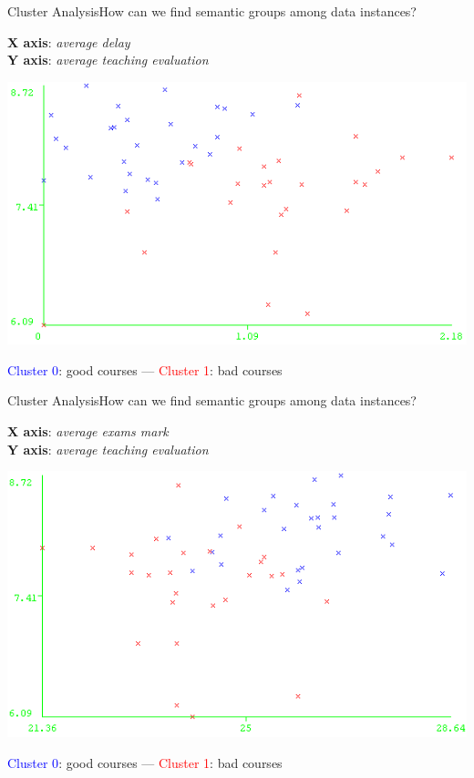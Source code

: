 \begin{frame}{Cluster Analysis}{How can we find semantic groups among data instances?}

\textbf{X axis}: \emph{average delay} \\ \textbf{Y axis}: \emph{average teaching evaluation}

    \vspace{0.1cm}
    \begin{centering}
        \hspace{0.5cm}\includegraphics[scale=0.46]{cluster2.png}
    \end{centering}

    \textcolor{blue}{Cluster 0}: good courses --- \textcolor{red}{Cluster 1}: bad courses

\end{frame}

\begin{frame}{Cluster Analysis}{How can we find semantic groups among data instances?}

\textbf{X axis}: \emph{average exams mark} \\ \textbf{Y axis}: \emph{average teaching evaluation}

    \vspace{0.1cm}
    \begin{centering}
        \hspace{0.5cm}\includegraphics[scale=0.46]{cluster3.png}
    \end{centering}

    \textcolor{blue}{Cluster 0}: good courses --- \textcolor{red}{Cluster 1}: bad courses

\end{frame}


